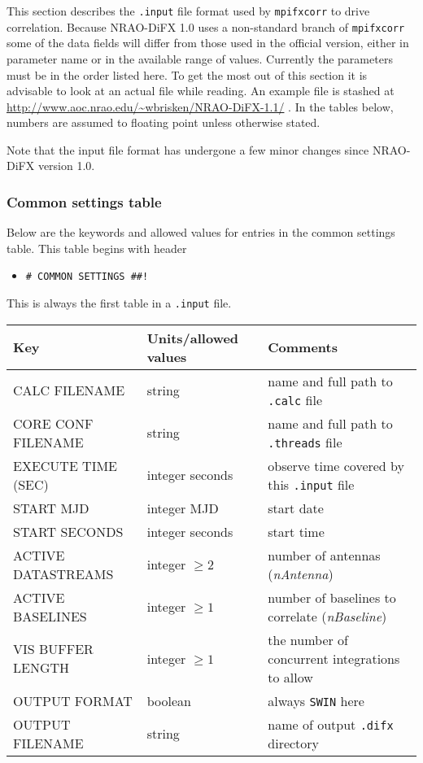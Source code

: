 This section describes the {\tt .input} file format used by {\tt mpifxcorr} to drive correlation.
Because NRAO-DiFX 1.0 uses a non-standard branch of {\tt mpifxcorr} some of the data fields will differ from those used in the official version, either in parameter name or in the available range of values.
Currently the parameters must be in the order listed here.
To get the most out of this section it is advisable to look at an actual file while reading.
An example file is stashed at \url{http://www.aoc.nrao.edu/~wbrisken/NRAO-DiFX-1.1/} .
In the tables below, numbers are assumed to floating point unless otherwise stated.

Note that the input file format has undergone a few minor changes since NRAO-DiFX version 1.0.

\subsubsection{Common settings table}

Below are the keywords and allowed values for entries in the common settings table.
This table begins with header 
\begin{itemize}
\item[] {\tt \verb+# COMMON SETTINGS ##!+} 
\end{itemize}
This is always the first table in a {\tt .input} file.

\begin{center}
\begin{tabular}{l l l}
\hline
Key & Units/allowed values & Comments \\
\hline
CALC FILENAME      & string & name and full path to {\tt .calc} file \\
CORE CONF FILENAME & string & name and full path to {\tt .threads} file \\
EXECUTE TIME (SEC) & integer seconds & observe time covered by this {\tt .input} file \\
START MJD          & integer MJD & start date \\
START SECONDS      & integer seconds & start time \\
ACTIVE DATASTREAMS & integer $\ge 2$ & number of antennas ({\em nAntenna}) \\
ACTIVE BASELINES   & integer $\ge 1$ & number of baselines to correlate ({\em nBaseline}) \\
VIS BUFFER LENGTH  & integer $\ge 1$ & the number of concurrent integrations to allow \\
OUTPUT FORMAT      & boolean & always {\tt SWIN} here \\
OUTPUT FILENAME    & string & name of output {\tt .difx} directory \\
\hline
\end{tabular}
\end{center}

